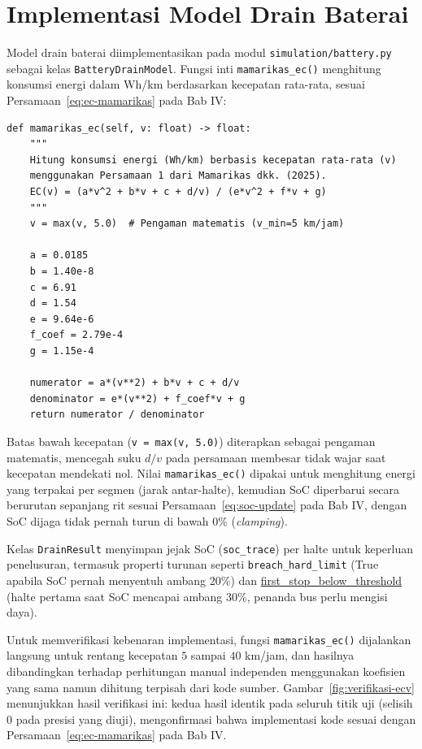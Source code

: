 \section{Implementasi Model Drain Baterai}

Model drain baterai diimplementasikan pada modul \texttt{simulation/battery.py}
sebagai kelas \texttt{BatteryDrainModel}. Fungsi inti \texttt{mamarikas\_ec()}
menghitung konsumsi energi dalam Wh/km berdasarkan kecepatan rata-rata,
sesuai Persamaan~\ref{eq:ec-mamarikas} pada Bab IV:

\begin{lstlisting}[caption=Implementasi Persamaan~\ref{eq:ec-mamarikas} pada \texttt{battery.py}, label=lst:mamarikas-ec]
	def mamarikas_ec(self, v: float) -> float:
	"""
	Hitung konsumsi energi (Wh/km) berbasis kecepatan rata-rata (v)
	menggunakan Persamaan 1 dari Mamarikas dkk. (2025).
	EC(v) = (a*v^2 + b*v + c + d/v) / (e*v^2 + f*v + g)
	"""
	v = max(v, 5.0)  # Pengaman matematis (v_min=5 km/jam)
	
	a = 0.0185
	b = 1.40e-8
	c = 6.91
	d = 1.54
	e = 9.64e-6
	f_coef = 2.79e-4
	g = 1.15e-4
	
	numerator = a*(v**2) + b*v + c + d/v
	denominator = e*(v**2) + f_coef*v + g
	return numerator / denominator
\end{lstlisting}

Batas bawah kecepatan (\texttt{v = max(v, 5.0)}) diterapkan sebagai
pengaman matematis, mencegah suku $d/v$ pada persamaan membesar tidak
wajar saat kecepatan mendekati nol. Nilai \texttt{mamarikas\_ec()} dipakai
untuk menghitung energi yang terpakai per segmen (jarak antar-halte),
kemudian SoC diperbarui secara berurutan sepanjang rit sesuai
Persamaan~\ref{eq:soc-update} pada Bab IV, dengan SoC dijaga tidak pernah
turun di bawah 0\% (\textit{clamping}).

Kelas \texttt{DrainResult} menyimpan jejak SoC (\texttt{soc\_trace}) per
halte untuk keperluan penelusuran, termasuk properti turunan seperti
\texttt{breach\_hard\_limit} (True apabila SoC pernah menyentuh ambang
20\%) dan \url{first_stop_below_threshold} (halte pertama saat SoC
mencapai ambang 30\%, penanda bus perlu mengisi daya).

Untuk memverifikasi kebenaran implementasi, fungsi \texttt{mamarikas\_ec()}
dijalankan langsung untuk rentang kecepatan $5$ sampai $40$ km/jam, dan
hasilnya dibandingkan terhadap perhitungan manual independen menggunakan
koefisien yang sama namun dihitung terpisah dari kode sumber.
Gambar~\ref{fig:verifikasi-ecv} menunjukkan hasil verifikasi ini: kedua
hasil identik pada seluruh titik uji (selisih $0$ pada presisi yang
diuji), mengonfirmasi bahwa implementasi kode sesuai dengan
Persamaan~\ref{eq:ec-mamarikas} pada Bab IV.


